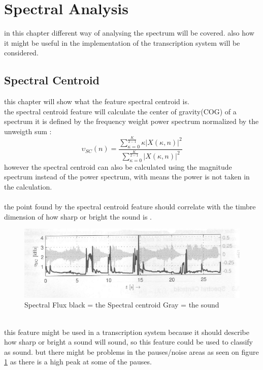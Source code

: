 \section{Spectral Analysis}
in this chapter different way of analysing the spectrum will be covered. also how it might be useful in the implementation of the transcription system will be considered.
\subsection{Spectral Centroid}
this chapter will show what the feature spectral centroid is.\\
the spectral centroid feature will calculate the center of gravity(COG) of a spectrum it is defined by the frequency weight power spectrum normalized by the unweigth sum \citep{ACA}:
\begin{equation}\label{Spectral Centroid eq}
	\upsilon_{SC}(n) = \frac{\displaystyle\sum_{\kappa = 0}^{\frac{K}{2-1}} \kappa\vert X(\kappa,n) \vert^2}{\displaystyle\sum_{\kappa = 0}^{\frac{K}{2-1}} \vert X(\kappa,n) \vert^2 }    
\end{equation} 
however the spectral centroid can also be calculated using the magnitude spectrum instead of the power spectrum, with means the power is not taken in the calculation\citep{ACA}.\\
\\
the point found by the spectral centroid feature should correlate with the timbre dimension of how sharp or bright the sound is \citep{ACA}.\\
\begin{figure}[h]
	\begin{center}
		\includegraphics[scale = 0.5]{fig/spectral_centroid.jpg}
		\caption{Spectral Flux black = the Spectral centroid Gray = the sound \citep{ACA}}
		\label{Spectral centroid pic}
	\end{center}
\end{figure}
\\

this feature might be used in a transcription system because it should describe how sharp or bright a sound will sound, so this feature could be used to classify as sound. but there might be problems in the pauses/noise areas as seen on figure \ref{Spectral centroid pic} as there is a high peak at some of the pauses. 
